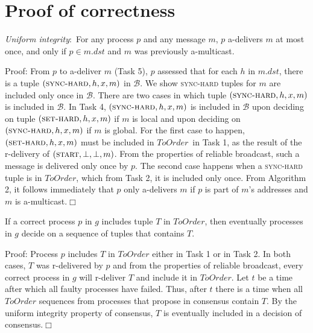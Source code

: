 \newcommand{\Pend}{\ensuremath{\mathit{ToOrder}}\xspace}
\newcommand{\Done}{\ensuremath{\mathit{Ordered}}\xspace}
\newcommand{\Decided}{\ensuremath{\mathit{Decided}}\xspace}
\newcommand{\Buffer}{\ensuremath{\mathcal{B}}\xspace}

\clearpage
\section{Proof of correctness}

\begin{proposition}
\textit{Uniform integrity}:~For any process $p$ and any message $m$, $p$ a-delivers $m$ at most once, and only if $p\in m.\mathit{dst}$ and $m$ was previously a-multicast.\end{proposition}
\noindent
{\sc Proof:} 
From $p$ to a-deliver $m$ (Task 5), $p$ assessed that for each $h$ in $m.dst$, there is a tuple $(\textsc{sync-hard}, h, x, m)$ in $\Buffer$.
We show \textsc{sync-hard} tuples for $m$ are included only once in \Buffer.
There are two cases in which tuple $(\textsc{sync-hard}, h, x, m)$ is included in $\Buffer$.
In Task 4, $(\textsc{sync-hard}, h, x, m)$ is included in $\Buffer$ upon deciding on tuple $(\textsc{set-hard}, h, x, m)$ if $m$ is local and upon deciding on $(\textsc{sync-hard}, h, x, m)$ if $m$ is global. 
For the first case to happen, $(\textsc{set-hard}, h, x, m)$ must be included in \Pend\ in Task 1, as the result of the r-delivery of $(\textsc{start},\bot,\bot,m)$.
From the properties of reliable broadcast, such a message is delivered only once by $p$.
The second case happens when a \textsc{sync-hard} tuple is in \Pend, which from Task 2, it is included only once.
From Algorithm 2, it follows immediately that $p$ only a-delivers $m$ if $p$ is part of $m$'s addresses and $m$ is a-multicast.\hfill$\Box$

\begin{lemma}
If a correct process $p$ in $g$ includes tuple $T$ in \Pend, then eventually processes in $g$ decide on a sequence of tuples that contains $T$.
\label{lemma:Y}
\end{lemma}
\noindent
{\sc Proof:} 
Process $p$ includes $T$ in \Pend either in Task 1 or in Task 2.
In both cases, $T$ was r-delivered by $p$ and from the properties of reliable broadcast, every correct process in $g$ will r-deliver $T$ and include it in \Pend.
Let $t$ be a time after which all faulty processes have failed.
Thus, after $t$ there is a time when all \Pend sequences from processes that propose in consensus contain $T$.
By the uniform integrity property of consensus, $T$ is eventually included in a decision of consensus.\hfill$\Box$


